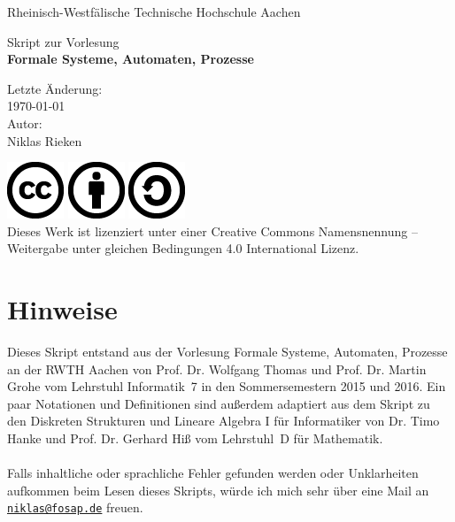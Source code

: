 \documentclass[11pt, a4paper]{article}
\theoremstyle{definition}
\theoremstyle{plain}
\numberwithin{equation}{section}
\begin{document}
\pagestyle{empty}
\begin{center}
    Rheinisch-Westf\"alische Technische Hochschule Aachen\\[10em]

    \begin{LARGE}
    		Skript zur Vorlesung\\[1.5em]
		\textbf{Formale Systeme, Automaten, Prozesse}
    \end{LARGE}
	\vfill
    \begin{Large}
    		Letzte Änderung:\\
    		\today\\[2em]
		Autor:\\
		Niklas Rieken\\
	\end{Large}
	\vfill
	\includegraphics[scale=.4]{icons/cc.png}
	\includegraphics[scale=.4]{icons/by.png}
	\includegraphics[scale=.4]{icons/sa.png}\\
	Dieses Werk ist lizenziert unter einer Creative Commons Namensnennung -- Weitergabe unter gleichen Bedingungen 4.0 International Lizenz.
\end{center}


\newpage
\vspace*{\fill}
\section*{Hinweise}
Dieses Skript entstand aus der Vorlesung Formale Systeme, Automaten, Prozesse an der RWTH Aachen von Prof. Dr. Wolfgang Thomas und Prof. Dr. Martin Grohe vom Lehrstuhl Informatik~7 in den Sommersemestern 2015 und 2016. Ein paar Notationen und Definitionen sind außerdem adaptiert aus dem Skript zu den Diskreten Strukturen und Lineare Algebra I für Informatiker von Dr. Timo Hanke und Prof. Dr. Gerhard Hiß vom Lehrstuhl~D für Mathematik.\\
\ \\
Falls inhaltliche oder sprachliche Fehler gefunden werden oder Unklarheiten aufkommen beim Lesen dieses Skripts, würde ich mich sehr über eine Mail an \href{mailto:niklas@fosap.de}{\texttt{niklas@fosap.de}} freuen.
\vspace*{\fill}
\end{document}
